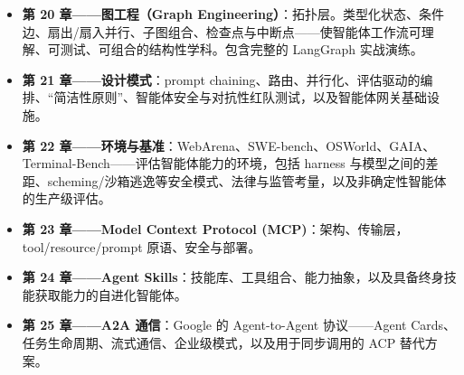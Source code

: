 \documentclass[11pt,a4paper,openany]{book}
\begin{document}
\begin{itemize}
  \item \textbf{第 20 章——图工程（Graph Engineering）}：拓扑层。类型化状态、条件边、扇出/扇入并行、子图组合、检查点与中断点——使智能体工作流可理解、可测试、可组合的结构性学科。包含完整的 LangGraph 实战演练。
  \item \textbf{第 21 章——设计模式}：prompt chaining、路由、并行化、评估驱动的编排、“简洁性原则”、智能体安全与对抗性红队测试，以及智能体网关基础设施。
  \item \textbf{第 22 章——环境与基准}：WebArena、SWE-bench、OSWorld、GAIA、Terminal-Bench——评估智能体能力的环境，包括 harness 与模型之间的差距、scheming/沙箱逃逸等安全模式、法律与监管考量，以及非确定性智能体的生产级评估。
  \item \textbf{第 23 章——Model Context Protocol (MCP)}：架构、传输层，tool/resource/prompt 原语、安全与部署。
  \item \textbf{第 24 章——Agent Skills}：技能库、工具组合、能力抽象，以及具备终身技能获取能力的自进化智能体。
  \item \textbf{第 25 章——A2A 通信}：Google 的 Agent-to-Agent 协议——Agent Cards、任务生命周期、流式通信、企业级模式，以及用于同步调用的 ACP 替代方案。

\end{itemize}
\end{document}

